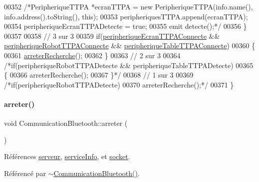 \begin{DoxyCode}
00352         \textcolor{comment}{/*PeripheriqueTTPA *ecranTTPA = new PeripheriqueTTPA(info.name(), info.address().toString(), this);}
00353 \textcolor{comment}{        peripheriquesTTPA.append(ecranTTPA);}
00354 \textcolor{comment}{        peripheriqueEcranTTPADetecte = true;}
00355 \textcolor{comment}{        emit detecte();*/}
00356     \}
00357 
00358     \textcolor{comment}{// 3 sur 3}
00359     \textcolor{keywordflow}{if}(\hyperlink{class_communication_bluetooth_ace9f69a994a3e9bbaab18ef48ff0f6a3}{peripheriqueEcranTTPAConnecte} && 
      \hyperlink{class_communication_bluetooth_a451b47553dd5cf716e8825c0fc0c203b}{peripheriqueRobotTTPAConnecte} && 
      \hyperlink{class_communication_bluetooth_a3b2e75b95ad66dd46d6b1268694c74dc}{peripheriqueTableTTPAConnecte})
00360     \{
00361         \hyperlink{class_communication_bluetooth_ab9993bd24a2f0c8254564a36cdf16069}{arreterRecherche}();
00362     \}
00363     \textcolor{comment}{// 2 sur 3}
00364     \textcolor{comment}{/*if(peripheriqueRobotTTPADetecte && peripheriqueTableTTPADetecte)}
00365 \textcolor{comment}{    \{}
00366 \textcolor{comment}{        arreterRecherche();}
00367 \textcolor{comment}{    \}*/}
00368     \textcolor{comment}{// 1 sur 3}
00369     \textcolor{comment}{/*if(peripheriqueRobotTTPADetecte)}
00370 \textcolor{comment}{        arreterRecherche();*/}
00371 \}
\end{DoxyCode}
\mbox{\label{class_communication_bluetooth_ac87aa0a33a650b981786979468d34324}} 
\paragraph{\texorpdfstring{arreter()}{arreter()}}
{\footnotesize\ttfamily void Communication\+Bluetooth\+::arreter (\begin{DoxyParamCaption}{ }\end{DoxyParamCaption})}



Références \hyperlink{class_communication_bluetooth_ace7c3b582db4257a20eb873ebfdf368a}{serveur}, \hyperlink{class_communication_bluetooth_a5ee2e50a8558ebb27b72a97343dabbf3}{service\+Info}, et \hyperlink{class_communication_bluetooth_aa07c388515488b3d38d37f1518bfd9d2}{socket}.



Référencé par \hyperlink{class_communication_bluetooth_a13c72d24359f40c204e94f3ef1ab6fd3}{$\sim$\+Communication\+Bluetooth()}.



